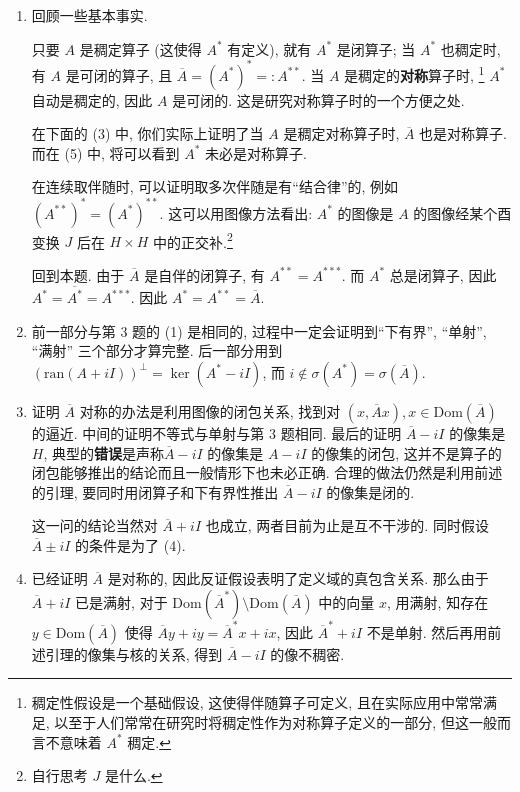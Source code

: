 \begin{enumerate}
    \item[(1)] 回顾一些基本事实. 

    只要 $A$ 是稠定算子 (这使得 $A^*$ 有定义), 就有 $A^*$ 是闭算子; 
    当 $A^*$ 也稠定时, 有 $A$ 是可闭的算子, 且 $\overline{A}=(A^*)^*=:A^{**}$. 
    当 $A$ 是稠定的\textbf{对称}算子时, 
    \footnote{稠定性假设是一个基础假设, 这使得伴随算子可定义, 且在实际应用中常常满足, 以至于人们常常在研究时将稠定性作为对称算子定义的一部分, 但这一般而言不意味着 $A^*$ 稠定.} 
    $A^*$ 自动是稠定的, 因此 $A$ 是可闭的. 这是研究对称算子时的一个方便之处.

    在下面的 (3) 中, 你们实际上证明了当 $A$ 是稠定对称算子时, $\overline{A}$ 也是对称算子. 而在 (5) 中, 将可以看到 $A^*$ 未必是对称算子.

    在连续取伴随时, 可以证明取多次伴随是有“结合律”的, 例如 $(A^{**})^*=(A^*)^{**}$. 
    这可以用图像方法看出: $A^*$ 的图像是 $A$ 的图像经某个酉变换 $J$ 后在 $H\times H$ 中的正交补.\footnote{自行思考 $J$ 是什么.}

    回到本题. 由于 $\overline{A}$ 是自伴的闭算子, 有 $A^{**}=A^{***}$. 
    而 $A^*$ 总是闭算子, 因此 $A^*=\overline{A^*}=A^{***}$. 因此 $A^*=A^{**}=\overline{A}$.
    \item[(2)] 前一部分与第 3 题的 (1) 是相同的, 过程中一定会证明到“下有界”, “单射”, “满射” 三个部分才算完整. 
    后一部分用到 $(\mathrm{ran}(A+iI))^\perp=\ker(A^*-iI)$, 而 $i\notin\sigma(A^*)=\sigma(\overline{A})$.
    \item[(3)] 证明 $\overline{A}$ 对称的办法是利用图像的闭包关系, 找到对 $(x,\overline{A}x),x\in\mathrm{Dom}(\overline{A})$ 的逼近. 
    中间的证明不等式与单射与第 3 题相同. 最后的证明 $\overline{A}-iI$ 的像集是 $H$, 
    \textcolor{cc0000}{典型的\textbf{错误}是声称$\overline{A}-iI$ 的像集是 $A-iI$ 的像集的闭包, 这并不是算子的闭包能够推出的结论而且一般情形下也未必正确.} 
    合理的做法仍然是利用前述的引理, 要同时用闭算子和下有界性推出 $\overline{A}-iI$ 的像集是闭的.

    这一问的结论当然对 $\overline{A}+iI$ 也成立, 两者目前为止是互不干涉的. 同时假设 $\overline{A}\pm iI$ 的条件是为了 (4).

    \item[(4)] 已经证明 $\overline{A}$ 是对称的, 因此反证假设表明了定义域的真包含关系. 
    那么由于 $\overline{A}+iI$ 已是满射, 对于 $\mathrm{Dom}(\overline{A}^*)\setminus\mathrm{Dom}(\overline{A})$ 中的向量 $x$, 
    用满射, 知存在 $y\in\mathrm{Dom}(\overline{A})$ 使得 $\overline{A}y+iy=\overline{A}^*x+ix$, 因此 $\overline{A}^*+iI$ 不是单射. 
    然后再用前述引理的像集与核的关系, 得到 $\overline{A}-iI$ 的像不稠密.


\end{enumerate}
